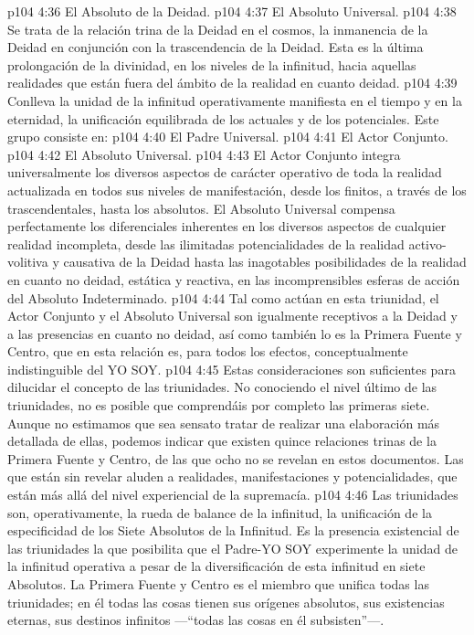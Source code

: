 \vs p104 4:36 El Absoluto de la Deidad.
\vs p104 4:37 El Absoluto Universal.
\vs p104 4:38 Se trata de la relación trina de la Deidad en el cosmos, la inmanencia de la Deidad en conjunción con la trascendencia de la Deidad. Esta es la última prolongación de la divinidad, en los niveles de la infinitud, hacia aquellas realidades que están fuera del ámbito de la realidad en cuanto deidad.
\vs p104 4:39 \pc {} Conlleva la unidad de la infinitud operativamente manifiesta en el tiempo y en la eternidad, la unificación equilibrada de los actuales y de los potenciales. Este grupo consiste en:
\vs p104 4:40 El Padre Universal.
\vs p104 4:41 El Actor Conjunto.
\vs p104 4:42 El Absoluto Universal.
\vs p104 4:43 \pc El Actor Conjunto integra universalmente los diversos aspectos de carácter operativo de toda la realidad actualizada en todos sus niveles de manifestación, desde los finitos, a través de los trascendentales, hasta los absolutos. El Absoluto Universal compensa perfectamente los diferenciales inherentes en los diversos aspectos de cualquier realidad incompleta, desde las ilimitadas potencialidades de la realidad activo\hyp{}volitiva y causativa de la Deidad hasta las inagotables posibilidades de la realidad en cuanto no deidad, estática y reactiva, en las incomprensibles esferas de acción del Absoluto Indeterminado.
\vs p104 4:44 Tal como actúan en esta triunidad, el Actor Conjunto y el Absoluto Universal son igualmente receptivos a la Deidad y a las presencias en cuanto no deidad, así como también lo es la Primera Fuente y Centro, que en esta relación es, para todos los efectos, conceptualmente indistinguible del YO SOY.
\vs p104 4:45 \pc Estas consideraciones son suficientes para dilucidar el concepto de las triunidades. No conociendo el nivel último de las triunidades, no es posible que comprendáis por completo las primeras siete. Aunque no estimamos que sea sensato tratar de realizar una elaboración más detallada de ellas, podemos indicar que existen quince relaciones trinas de la Primera Fuente y Centro, de las que ocho no se revelan en estos documentos. Las que están sin revelar aluden a realidades, manifestaciones y potencialidades, que están más allá del nivel experiencial de la supremacía.
\vs p104 4:46 Las triunidades son, operativamente, la rueda de balance de la infinitud, la unificación de la especificidad de los Siete Absolutos de la Infinitud. Es la presencia existencial de las triunidades la que posibilita que el Padre\hyp{}YO SOY experimente la unidad de la infinitud operativa a pesar de la diversificación de esta infinitud en siete Absolutos. La Primera Fuente y Centro es el miembro que unifica todas las triunidades; en él todas las cosas tienen sus orígenes absolutos, sus existencias eternas, sus destinos infinitos ---“todas las cosas en él subsisten”---.
